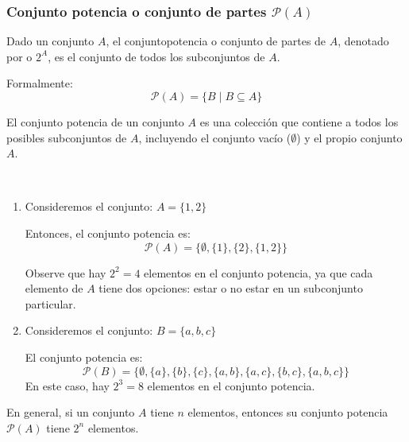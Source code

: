 \subsubsection{Conjunto potencia o conjunto de partes $\mathcal{P}(A)$}
\vspace{1em}
 
\begin{fmd-definition}
	Dado un conjunto \(A\), el \gls{conjuntopotencia} o conjunto de partes de \(A\), denotado por  o \(2^A\), es el conjunto de todos los subconjuntos de \(A\). 
	
	Formalmente:
	$$\mathcal{P}(A) = \{B \mid B \subseteq A\}$$
	
	El conjunto potencia de un conjunto \(A\) es una colección que contiene a todos los posibles subconjuntos de \(A\), incluyendo el conjunto vacío (\(\emptyset\)) y el propio conjunto \(A\).
\end{fmd-definition}


\begin{example}
	\
	\begin{enumerate}
		\item Consideremos el conjunto: \(A = \{1, 2\}\)
		
		Entonces, el conjunto potencia es:
		$$\mathcal{P}(A) = \{\emptyset, \{1\}, \{2\}, \{1, 2\}\}$$
		
		Observe que hay \(2^2 = 4\) elementos en el conjunto potencia, ya que cada elemento de \(A\) tiene dos opciones: estar o no estar en un subconjunto particular.
		
		\item Consideremos el conjunto: \(B = \{a, b, c\}\)
		
		El conjunto potencia es:
		$$\mathcal{P}(B) = \{\emptyset, \{a\}, \{b\}, \{c\}, \{a, b\}, \{a, c\}, \{b, c\}, \{a, b, c\}\}$$
		En este caso, hay \(2^3 = 8\) elementos en el conjunto potencia.
	\end{enumerate}
\end{example}

\begin{lgnote}
	En general, si un conjunto \(A\) tiene \(n\) elementos, entonces su conjunto potencia \(\mathcal{P}(A)\) tiene \(2^n\) elementos.
\end{lgnote}

